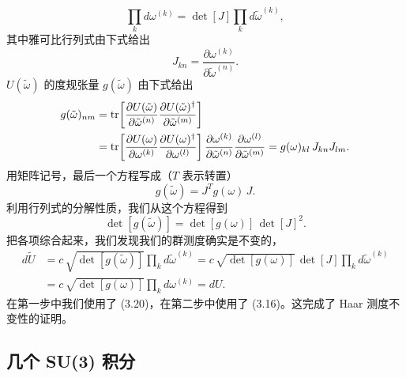 \begin{equation}
  \prod_k d\omega^{(k)} = \det[J]\prod_k d\tilde\omega^{(k)},
\end{equation}
其中雅可比行列式由下式给出
\begin{equation}
  J_{kn} = \frac{\partial \omega^{(k)}}{\partial \tilde\omega^{(n)}}.
\end{equation}
$U(\tilde\omega)$ 的度规张量 $g(\tilde\omega)$ 由下式给出
\begin{equation}
\begin{split}
  g(\tilde\omega)_{nm} &= \operatorname{tr}\!\left[
    \frac{\partial U(\tilde\omega)}{\partial \tilde\omega^{(n)}}
    \frac{\partial U(\tilde\omega)^{\dagger}}{\partial \tilde\omega^{(m)}}
  \right] \\
  &= \operatorname{tr}\!\left[
    \frac{\partial U(\omega)}{\partial \omega^{(k)}}
    \frac{\partial U(\omega)^{\dagger}}{\partial \omega^{(l)}}
  \right]\frac{\partial \omega^{(k)}}{\partial \tilde\omega^{(n)}}
   \frac{\partial \omega^{(l)}}{\partial \tilde\omega^{(m)}}
  = g(\omega)_{kl}\,J_{kn} J_{lm}.
\end{split}
\end{equation}
用矩阵记号，最后一个方程写成（$T$ 表示转置）
\begin{equation}
  g(\tilde\omega) = J^T g(\omega)\,J .
\end{equation}
利用行列式的分解性质，我们从这个方程得到
\begin{equation}
  \det[g(\tilde\omega)] = \det[g(\omega)]\,\det[J]^2 .
\end{equation}
把各项综合起来，我们发现我们的群测度确实是不变的，
\begin{equation}
\begin{split}
  d\tilde U &= c\,\sqrt{\det[g(\tilde\omega)]}\prod_k d\tilde\omega^{(k)}
  = c\,\sqrt{\det[g(\omega)]}\,\det[J]\prod_k d\tilde\omega^{(k)} \\
  &= c\,\sqrt{\det[g(\omega)]}\prod_k d\omega^{(k)} = dU .
\end{split}
\end{equation}
在第一步中我们使用了 (3.20)，在第二步中使用了 (3.16)。这完成了 Haar 测度不变性的证明。

\subsection{几个 SU(3) 积分}


